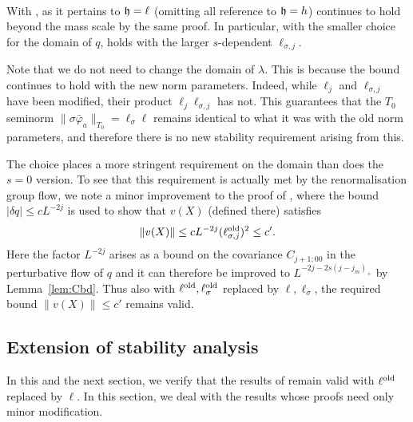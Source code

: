 \paragraph{\cite[Proposition~\ref{IE-prop:monobd}]{BS-rg-IE}}
With , \cite[Proposition~\ref{IE-prop:monobd}]{BS-rg-IE}
as it pertains to $\mathfrak{h}=\ell$ (omitting all reference to $\mathfrak{h}=h$) continues to hold beyond
the mass scale by the same proof.
In particular, with the smaller choice for the domain of $q$,
\cite[\eqref{IE-e:qhsig}]{BS-rg-IE} holds with the larger $s$-dependent $\ell_{\sigma,j}$.

\medskip
Note that we do not need to change the domain of $\lambda$.
This is because the bound \cite[\eqref{IE-e:hsigh}]{BS-rg-IE}
continues to hold with the new norm parameters. Indeed, while $\ell_j$
and $\ell_{\sigma,j}$ have been modified, their product $\ell_j \ell_{\sigma,j}$
has not.
This guarantees that the $T_0$ seminorm
$\|\sigma\bar\varphi_a\|_{T_0} = \ell_\sigma \ell$ remains identical to what it was
with the old norm parameters, and therefore there is no new stability requirement
arising from this.

The choice  places a more stringent requirement on the domain
than does the $s=0$ version.  To see that this requirement is actually met
by the renormalisation group flow,
we note a minor improvement to the proof of \cite[Lemma~\ref{step-lem:K7a}(ii)]{BS-rg-step},
where the bound $|\delta q| \leq c L^{-2j}$ is used to show that $v(X)$
(defined there) satisfies
\begin{equation}
\lbeq{vXbd}
\|v(X)\| \leq c L^{-2j} (\ell_{\sigma,j}^\oldrm)^2 \leq c'.
\end{equation}
Here the factor $L^{-2j}$ arises
as a bound on the covariance $C_{j+1;00}$ in the perturbative flow
\cite[\eqref{pt-e:qpt2}]{BS-rg-IE} of $q$ and it can therefore be improved to $L^{-2j-2s(j - j_m)_+}$
by Lemma~\ref{lem:Cbd}.
Thus also with $\ell^{\mathrm{old}}, \ell_{\sigma}^{\rm old}$ replaced by $\ell,\ell_{\sigma}$,
the required bound $\|v(X)\| \leq c'$ remains valid.


\subsection{Extension of stability analysis}
\label{sec:stability2}

In this and the next section,
we verify that the results of \cite[Section~\ref{IE-sec:IE}]{BS-rg-IE}
remain valid with $\ell^{\mathrm{old}}$ replaced by $\ell$.
In this section, we deal with the results whose proofs need only minor
modification.

